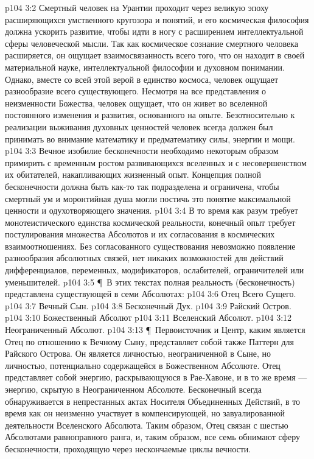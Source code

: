\vs p104 3:2 Смертный человек на Урантии проходит через великую эпоху расширяющихся умственного кругозора и понятий, и его космическая философия должна ускорить развитие, чтобы идти в ногу с расширением интеллектуальной сферы человеческой мысли. Так как космическое сознание смертного человека расширяется, он ощущает взаимосвязанность всего того, что он находит в своей материальной науке, интеллектуальной философии и духовном понимании. Однако, вместе со всей этой верой в единство космоса, человек ощущает разнообразие всего существующего. Несмотря на все представления о неизменности Божества, человек ощущает, что он живет во вселенной постоянного изменения и развития, основанного на опыте. Безотносительно к реализации выживания духовных ценностей человек всегда должен был принимать во внимание математику и предматематику силы, энергии и мощи.
\vs p104 3:3 Вечное изобилие бесконечности необходимо некоторым образом примирить с временным ростом развивающихся вселенных и с несовершенством их обитателей, накапливающих жизненный опыт. Концепция полной бесконечности должна быть как\hyp{}то так подразделена и ограничена, чтобы смертный ум и моронтийная душа могли постичь это понятие максимальной ценности и одухотворяющего значения.
\vs p104 3:4 В то время как разум требует монотеистического единства космической реальности, конечный опыт требует постулирования множества Абсолютов и их согласования в космических взаимоотношениях. Без согласованного существования невозможно появление разнообразия абсолютных связей, нет никаких возможностей для действий дифференциалов, переменных, модификаторов, ослабителей, ограничителей или уменьшителей.
\vs p104 3:5 \P\ В этих текстах полная реальность (бесконечность) представлена существующей в семи Абсолютах:
\vs p104 3:6 \bibnobreakspace Отец Всего Сущего.
\vs p104 3:7 \bibnobreakspace Вечный Сын.
\vs p104 3:8 \bibnobreakspace Бесконечный Дух.
\vs p104 3:9 \bibnobreakspace Райский Остров.
\vs p104 3:10 \bibnobreakspace Божественный Абсолют
\vs p104 3:11 \bibnobreakspace Вселенский Абсолют.
\vs p104 3:12 \bibnobreakspace Неограниченный Абсолют.
\vs p104 3:13 \P\ Первоисточник и Центр, каким является Отец по отношению к Вечному Сыну, представляет собой также Паттерн для Райского Острова. Он является личностью, неограниченной в Сыне, но личностью, потенциально содержащейся в Божественном Абсолюте. Отец представляет собой энергию, раскрывающуюся в Рае\hyp{}Хавоне, и в то же время --- энергию, скрытую в Неограниченном Абсолюте. Бесконечный всегда обнаруживается в непрестанных актах Носителя Объединенных Действий, в то время как он неизменно участвует в компенсирующей, но завуалированной деятельности Вселенского Абсолюта. Таким образом, Отец связан с шестью Абсолютами равноправного ранга, и, таким образом, все семь обнимают сферу бесконечности, проходящую через нескончаемые циклы вечности.
